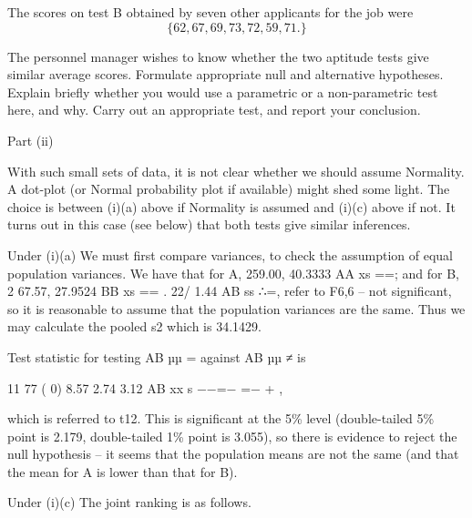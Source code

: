 \documentclass[a4paper,12pt]{article}
\begin{document}
\begin{enumerate}[(a)]
\begin{framed}
The scores on test B obtained by seven other applicants for the job were 
 \[\{62,  67,  69,  73,  72,  59,  71.  \}\]
 
The personnel manager wishes to know whether the two aptitude tests give similar average scores.  Formulate appropriate null and alternative hypotheses.  Explain briefly whether you would use a parametric or a non-parametric test here, and why.  Carry out an appropriate test, and report your conclusion.  
 
 
\end{framed} 
 
Part (ii) 
 
With such small sets of data, it is not clear whether we should assume Normality.  A dot-plot (or Normal probability plot if available) might shed some light.  The choice is between (i)(a) above if Normality is assumed and (i)(c) above if not.  It turns out in this case (see below) that both tests give similar inferences. 
 
Under (i)(a) 
 We must first compare variances, to check the assumption of equal population variances.  We have that for A, 259.00, 40.3333 AA xs ==;  and for B, 2 67.57, 27.9524 BB xs == .  22/ 1.44 AB ss ∴=,  refer to F6,6  –  not significant, so it is reasonable to assume that the population variances are the same. 
 Thus we may calculate the pooled s2 which is 34.1429. 
 
Test statistic for testing AB µµ = against AB µµ ≠ is 
 
11 77 ( 0) 8.57 2.74 3.12 AB xx s −−=− =− +
, 
 
which is referred to t12.  This is significant at the 5\% level (double-tailed 5\% point is 2.179, double-tailed 1\% point is 3.055), so there is evidence to reject the null hypothesis  –  it seems that the population means are not the same (and that the mean for A is lower than that for B). 
 
Under (i)(c) 
 The joint ranking is as follows. 
 

\end{enumerate}
\end{document}

